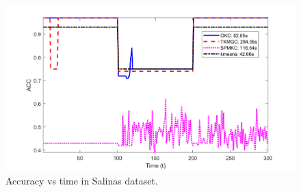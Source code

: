 \documentclass[10pt,final]{IEEEtran}
\begin{document}
\begin{figure}[htp]
    \centering
    \includegraphics[scale=0.19]{avg_combined_ACC_plots_Salinas.png}
    \caption{Accuracy vs time in Salinas dataset.}
    \label{Fig:4}
\end{figure}
\end{document}
